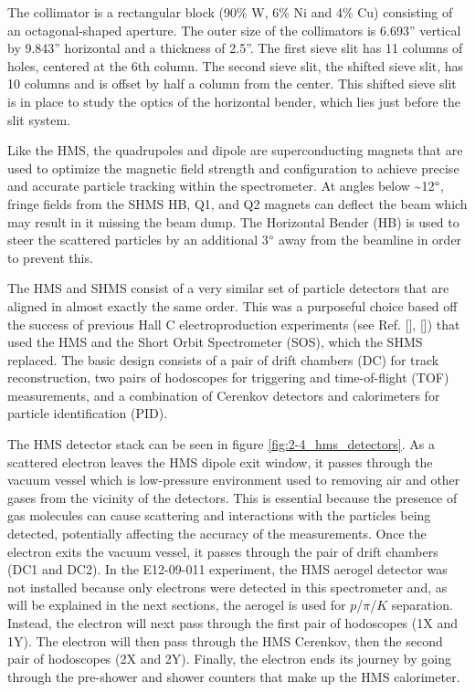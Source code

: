 \documentclass[
]{report}
\begin{document}
The collimator is a rectangular block (90\% W, 6\% Ni and 4\% Cu)
consisting of an octagonal-shaped aperture. The outer size of the
collimators is 6.693'' vertical by 9.843'' horizontal and a thickness of
2.5''. The first sieve slit has 11 columns of holes, centered at the 6th
column. The second sieve slit, the shifted sieve slit, has 10 columns
and is offset by half a column from the center. This shifted sieve slit
is in place to study the optics of the horizontal bender, which lies
just before the slit system.



Like the HMS, the quadrupoles and dipole are superconducting magnets
that are used to optimize the magnetic field strength and configuration
to achieve precise and accurate particle tracking within the
spectrometer. At angles below \textasciitilde12\(\degree\), fringe
fields from the SHMS HB, Q1, and Q2 magnets can deflect the beam which
may result in it missing the beam dump. The Horizontal Bender (HB) is
used to steer the scattered particles by an additional 3\(\degree\) away
from the beamline in order to prevent this.

\label{Chapter-2-5}

\label{sec:chap_3_detectors}

The HMS and SHMS consist of a very similar set of particle detectors
that are aligned in almost exactly the same order. This was a purposeful
choice based off the success of previous Hall C electroproduction
experiments (see Ref. {[}\cite{horn_determination_2006}{]},
{[}\cite{blok_charged_2008}{]}) that used the HMS and the Short Orbit
Spectrometer (SOS), which the SHMS replaced. The basic design consists
of a pair of drift chambers (DC) for track reconstruction, two pairs of
hodoscopes for triggering and time-of-flight (TOF) measurements, and a
combination of Cerenkov detectors and calorimeters for particle
identification (PID).



The HMS detector stack can be seen in figure
\ref{fig:2-4_hms_detectors}. As a scattered electron leaves the HMS
dipole exit window, it passes through the vacuum vessel which is
low-pressure environment used to removing air and other gases from the
vicinity of the detectors. This is essential because the presence of gas
molecules can cause scattering and interactions with the particles being
detected, potentially affecting the accuracy of the measurements. Once
the electron exits the vacuum vessel, it passes through the pair of
drift chambers (DC1 and DC2). In the E12-09-011 experiment, the HMS
aerogel detector was not installed because only electrons were detected
in this spectrometer and, as will be explained in the next sections, the
aerogel is used for \(p\)/\(\pi\)/\(K\) separation. Instead, the
electron will next pass through the first pair of hodoscopes (1X and
1Y). The electron will then pass through the HMS Cerenkov, then the
second pair of hodoscopes (2X and 2Y). Finally, the electron ends its
journey by going through the pre-shower and shower counters that make up
the HMS calorimeter.
\end{document}
